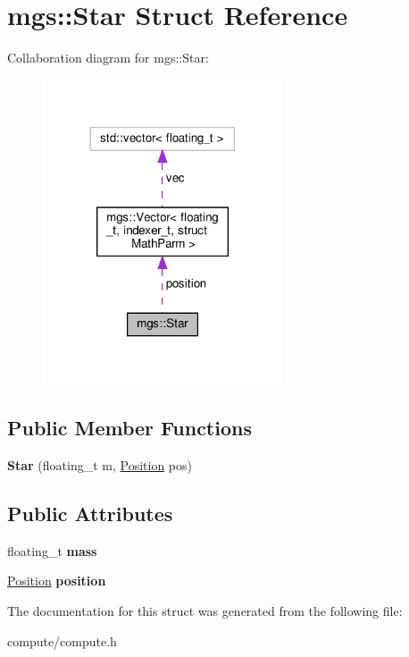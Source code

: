 \hypertarget{structmgs_1_1Star}{}\section{mgs\+:\+:Star Struct Reference}
\label{structmgs_1_1Star}


Collaboration diagram for mgs\+:\+:Star\+:
\nopagebreak
\begin{figure}[H]
\begin{center}
\leavevmode
\includegraphics[width=201pt]{structmgs_1_1Star__coll__graph}
\end{center}
\end{figure}
\subsection*{Public Member Functions}
\begin{DoxyCompactItemize}
\item 
\mbox{\label{structmgs_1_1Star_a121fa9572ba0a7645a3310beabc25318}} 
{\bfseries Star} (floating\+\_\+t m, \hyperlink{structmgs_1_1Vector}{Position} pos)
\end{DoxyCompactItemize}
\subsection*{Public Attributes}
\begin{DoxyCompactItemize}
\item 
\mbox{\label{structmgs_1_1Star_a9899c0d2ad809ebaf09fcdbf1754d90e}} 
floating\+\_\+t {\bfseries mass}
\item 
\mbox{\label{structmgs_1_1Star_ac752567d2e017648aa93603f5cfe3b0c}} 
\hyperlink{structmgs_1_1Vector}{Position} {\bfseries position}
\end{DoxyCompactItemize}


The documentation for this struct was generated from the following file\+:\begin{DoxyCompactItemize}
\item 
compute/compute.\+h\end{DoxyCompactItemize}
